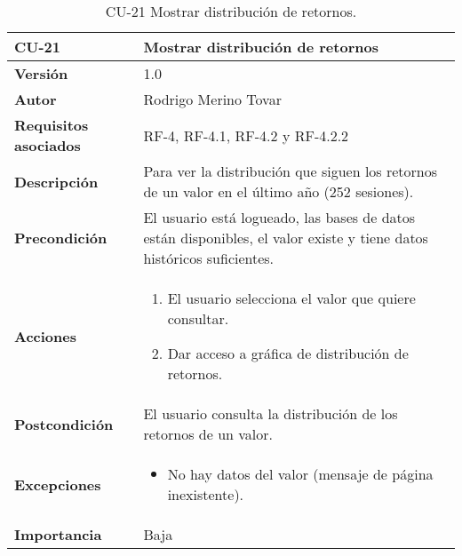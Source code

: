 \begin{table}[p]
	\centering
	\begin{tabularx}{\linewidth}{ p{} p{} }
		\toprule
		\textbf{CU-21}    & \textbf{Mostrar distribución de retornos}\\
		\toprule
		\textbf{Versión}              & 1.0    \\
		\textbf{Autor}                & Rodrigo Merino Tovar \\
		\textbf{Requisitos asociados} & RF-4, RF-4.1, RF-4.2 y RF-4.2.2 \\
		\textbf{Descripción}          & Para ver la distribución que siguen los retornos de un valor en el último año (252 sesiones).\\
		\textbf{Precondición}         & El usuario está logueado, las bases de datos están disponibles, el valor existe y tiene datos históricos suficientes.  \\
		\textbf{Acciones}             &
		\begin{enumerate}
			\def\labelenumi{\arabic{enumi}.}
			\tightlist 
			\item El usuario selecciona el valor que quiere consultar. 
			\item Dar acceso a gráfica de distribución de retornos.
		\end{enumerate}\\
		\textbf{Postcondición}        & El usuario consulta la distribución de los retornos de un valor. \\
		\textbf{Excepciones}          & 
		\begin{itemize}
			\tightlist
			\item No hay datos del valor (mensaje de página inexistente).
		\end{itemize} \\
		\textbf{Importancia}          & Baja \\
		\bottomrule
	\end{tabularx}
	\caption{CU-21 Mostrar distribución de retornos.}
\end{table}


